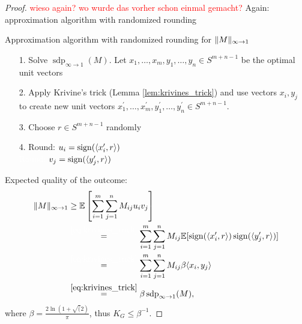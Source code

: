 \begin{proof}
	\textcolor{red}{wieso again? wo wurde das vorher schon einmal gemacht?}
	Again: approximation algorithm with randomized rounding
	
	\begin{algorithm}[H]
		\SetAlgoLined
		\caption{Approximation algorithm with randomized rounding for $ \Vert {M} \Vert_{\infty\to 1}$}
	\end{algorithm}
	\begin{itemize}
		\item[1.] Solve $\operatorname{sdp}_{\infty\to 1} (M)$. Let $x_1,\dots,x_m,y_1,\dots,y_n\in S^{m+n-1}$ be the optimal unit vectors
		\item[2.] Apply Krivine's trick (Lemma \ref{lem:krivines_trick}) and use vectors $x_i,y_j$ to create new unit vectors $x_1^\prime,\dots,x_m^\prime, y_1^\prime,\dots,y_n^\prime\in S^{m+n-1}$.
		\item[3.] Choose $r\in S^{m+n-1}$ randomly
		\item[4.] Round: $u_i = \operatorname{sign}(\langle{x_i^\prime},{r}\rangle)$\\
					\textcolor{white}{Round: }$v_j = \operatorname{sign}(\langle{y_j^\prime},{r}\rangle)$
	\end{itemize}
	
	\noindent Expected quality of the outcome:
	\begin{align*}
		\norm{M}_{\infty\to 1} &\geq \mathbb{E}\left[\sum_{i=1}^m\sum_{j=1}^n M_{ij}u_iv_j\right]\\
		&\overset{\textcolor{white}{\eqref*{eq:krivines_trick}}}{=} \sum_{i=1}^m\sum_{j=1}^n M_{ij} \mathbb{E}[\sgn(\sclr{x_i^\prime}{r}) \sgn(\sclr{y_j^\prime}{r})] \\
		&\overset{\textcolor{white}{\eqref*{eq:krivines_trick}}}{=}\sum_{i=1}^m\sum_{j=1}^n M_{ij}\beta \sclr{x_i}{y_j} \\
		&\overset{\eqref{eq:krivines_trick}}{=}\beta \operatorname{sdp}_{\infty\to 1}(M),
	\end{align*}
	where $\beta = \frac{2\ln(1+\sqrt(2)}{\pi}$, thus $K_G\leq \beta^{-1}$.
\end{proof}

